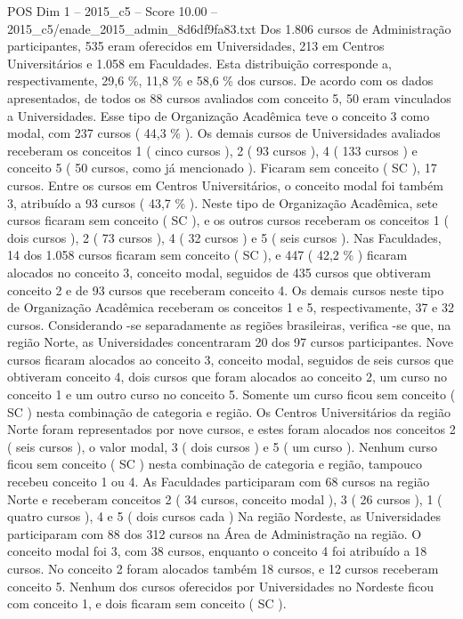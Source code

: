 \begin{textsample}{POS Dim 1 – 2015\_c5 – Score 10.00 – 2015\_c5/enade\_2015\_admin\_8d6df9fa83.txt}
Dos 1.806 cursos de Administração participantes, 535 eram oferecidos em Universidades, 213 em Centros Universitários e 1.058 em Faculdades.
Esta distribuição corresponde a, respectivamente, 29,6 \%, 11,8 \% e 58,6 \% dos cursos.
De acordo com os dados apresentados, de todos os 88 cursos avaliados com conceito 5, 50 eram vinculados a Universidades.
Esse tipo de Organização Acadêmica teve o conceito 3 como modal, com 237 cursos ( 44,3 \% ).
Os demais cursos de Universidades avaliados receberam os conceitos 1 ( cinco cursos ), 2 ( 93 cursos ), 4 ( 133 cursos ) e conceito 5 ( 50 cursos, como já mencionado ).
Ficaram sem conceito ( SC ), 17 cursos.
Entre os cursos em Centros Universitários, o conceito modal foi também 3, atribuído a 93 cursos ( 43,7 \% ).
Neste tipo de Organização Acadêmica, sete cursos ficaram sem conceito ( SC ), e os outros cursos receberam os conceitos 1 ( dois cursos ), 2 ( 73 cursos ), 4 ( 32 cursos ) e 5 ( seis cursos ).
Nas Faculdades, 14 dos 1.058 cursos ficaram sem conceito ( SC ), e 447 ( 42,2 \% ) ficaram alocados no conceito 3, conceito modal, seguidos de 435 cursos que obtiveram conceito 2 e de 93 cursos que receberam conceito 4.
Os demais cursos neste tipo de Organização Acadêmica receberam os conceitos 1 e 5, respectivamente, 37 e 32 cursos.
Considerando -se separadamente as regiões brasileiras, verifica -se que, na região Norte, as Universidades concentraram 20 dos 97 cursos participantes.
Nove cursos ficaram alocados ao conceito 3, conceito modal, seguidos de seis cursos que obtiveram conceito 4, dois cursos que foram alocados ao conceito 2, um curso no conceito 1 e um outro curso no conceito 5.
Somente um curso ficou sem conceito ( SC ) nesta combinação de categoria e região.
Os Centros Universitários da região Norte foram representados por nove cursos, e estes foram alocados nos conceitos 2 ( seis cursos ), o valor modal, 3 ( dois cursos ) e 5 ( um curso ).
Nenhum curso ficou sem conceito ( SC ) nesta combinação de categoria e região, tampouco recebeu conceito 1 ou 4.
As Faculdades participaram com 68 cursos na região Norte e receberam conceitos 2 ( 34 cursos, conceito modal ), 3 ( 26 cursos ), 1 ( quatro cursos ), 4 e 5 ( dois cursos cada ) Na região Nordeste, as Universidades participaram com 88 dos 312 cursos na Área de Administração na região.
O conceito modal foi 3, com 38 cursos, enquanto o conceito 4 foi atribuído a 18 cursos.
No conceito 2 foram alocados também 18 cursos, e 12 cursos receberam conceito 5.
Nenhum dos cursos oferecidos por Universidades no Nordeste ficou com conceito 1, e dois ficaram sem conceito ( SC ).

\end{textsample}

